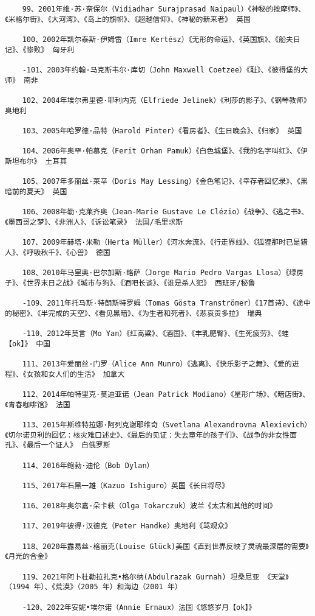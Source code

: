 \documentclass[UTF8]{../RepresentationUniverse}
\begin{document}
\begin{lstlisting}
    99、2001年维·苏·奈保尔（Vidiadhar Surajprasad Naipaul）《神秘的按摩师》、《米格尔街》、《大河湾》、《岛上的旗帜》、《超越信仰》、《神秘的新来者》 英国
    
    100、2002年凯尔泰斯·伊姆雷（Imre Kertész）《无形的命运》、《英国旗》、《船夫日记》、《惨败》 匈牙利
    
    -101、2003年约翰·马克斯韦尔·库切（John Maxwell Coetzee）《耻》、《彼得堡的大师》 南非
    
    102、2004年埃尔弗里德·耶利内克（Elfriede Jelinek）《利莎的影子》、《钢琴教师》 奥地利
    
    103、2005年哈罗德·品特（Harold Pinter）《看房者》、《生日晚会》、《归家》 英国
    
    104、2006年奥罕·帕慕克（Ferit Orhan Pamuk）《白色城堡》、《我的名字叫红》、《伊斯坦布尔》 土耳其
    
    105、2007年多丽丝·莱辛（Doris May Lessing）《金色笔记》、《幸存者回忆录》、《黑暗前的夏天》 英国
    
    106、2008年勒·克莱齐奥（Jean-Marie Gustave Le Clézio）《战争》、《逃之书》、《墨西哥之梦》、《非洲人》、《诉讼笔录》 法国/毛里求斯
    
    107、2009年赫塔·米勒（Herta Müller）《河水奔流》、《行走界线》、《狐狸那时已是猎人》、《呼吸秋千》、《心兽》 德国
    
    108、2010年马里奥·巴尔加斯·略萨（Jorge Mario Pedro Vargas Llosa）《绿房子》、《世界末日之战》《城市与狗》、《酒吧长谈》、《谁是杀人犯》 西班牙/秘鲁
    
    -109、2011年托马斯·特朗斯特罗姆（Tomas Gösta Tranströmer）《17首诗》、《途中的秘密》、《半完成的天空》、《看见黑暗》、《为生者和死者》、《悲哀贡多拉》 瑞典
    
    -110、2012年莫言（Mo Yan）《红高粱》、《酒国》、《丰乳肥臀》、《生死疲劳》、《蛙【ok】》 中国
    
    111、2013年爱丽丝·门罗（Alice Ann Munro）《逃离》、《快乐影子之舞》、《爱的进程》、《女孩和女人们的生活》 加拿大
    
    112、2014年帕特里克·莫迪亚诺（Jean Patrick Modiano）《星形广场》、《暗店街》、《青春咖啡馆》 法国
    
    113、2015年斯维特拉娜·阿列克谢耶维奇（Svetlana Alexandrovna Alexievich）《切尔诺贝利的回忆：核灾难口述史》、《最后的见证：失去童年的孩子们》、《战争的非女性面孔》、《最后一个证人》 白俄罗斯
    
    114、2016年鲍勃·迪伦（Bob Dylan）
    
    115、2017年石黑一雄（Kazuo Ishiguro）英国《长日将尽》
    
    116、2018年奥尔嘉·朵卡萩（Olga Tokarczuk）波兰《太古和其他的时间》
    
    117、2019年彼得·汉德克（Peter Handke）奥地利《骂观众》
    
    118、2020年露易丝·格丽克(Louise Glück)美国《直到世界反映了灵魂最深层的需要》《月光的合金》
    
    119、2021年阿卜杜勒拉扎克•格尔纳(Abdulrazak Gurnah) 坦桑尼亚 《天堂》（1994 年）、《荒漠》（2005 年）和海边（2001 年）

    -120、2022年安妮•埃尔诺（Annie Ernaux）法国《悠悠岁月【ok】》
\end{lstlisting}
\end{document}
